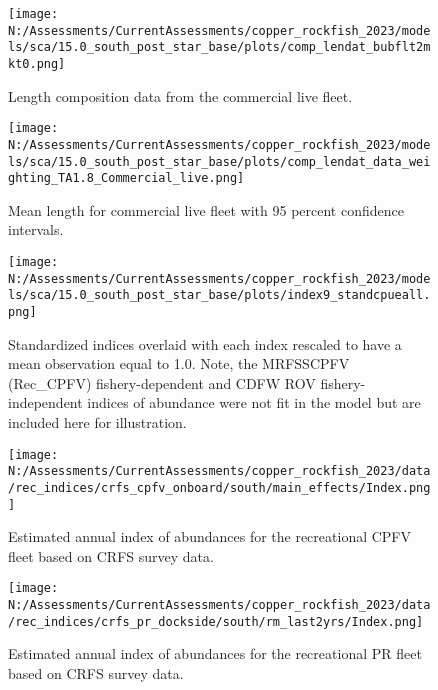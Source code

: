 \documentclass[11pt,
  english,
  letterpaper,
]{article}
\begin{document}
\pagebreak

\begin{figure}
\centering
\texttt{[image: N:/Assessments/CurrentAssessments/copper\_rockfish\_2023/models/sca/15.0\_south\_post\_star\_base/plots/comp\_lendat\_bubflt2mkt0.png]}
\caption{Length composition data from the commercial live fleet.\label{fig:com-live-len-data}}
\end{figure}

\pagebreak

\begin{figure}
\centering
\texttt{[image: N:/Assessments/CurrentAssessments/copper\_rockfish\_2023/models/sca/15.0\_south\_post\_star\_base/plots/comp\_lendat\_data\_weighting\_TA1.8\_Commercial\_live.png]}
\caption{Mean length for commercial live fleet with 95 percent confidence intervals.\label{fig:mean-com-live-len-data}}
\end{figure}

\pagebreak

\begin{figure}
\centering
\texttt{[image: N:/Assessments/CurrentAssessments/copper\_rockfish\_2023/models/sca/15.0\_south\_post\_star\_base/plots/index9\_standcpueall.png]}
\caption{Standardized indices overlaid with each index rescaled to have a mean observation equal to 1.0. Note, the MRFSSCPFV (Rec\_CPFV) fishery-dependent and CDFW ROV fishery-independent indices of abundance were not fit in the model but are included here for illustration.\label{fig:stand-cpue}}
\end{figure}

\pagebreak

\begin{figure}
\centering
\texttt{[image: N:/Assessments/CurrentAssessments/copper\_rockfish\_2023/data/rec\_indices/crfs\_cpfv\_onboard/south/main\_effects/Index.png]}
\caption{Estimated annual index of abundances for the recreational CPFV fleet based on CRFS survey data.\label{fig:crfs-index-main}}
\end{figure}

\pagebreak

\begin{figure}
\centering
\texttt{[image: N:/Assessments/CurrentAssessments/copper\_rockfish\_2023/data/rec\_indices/crfs\_pr\_dockside/south/rm\_last2yrs/Index.png]}
\caption{Estimated annual index of abundances for the recreational PR fleet based on CRFS survey data.\label{fig:crfs-pr-index-main}}
\end{figure}
\end{document}
